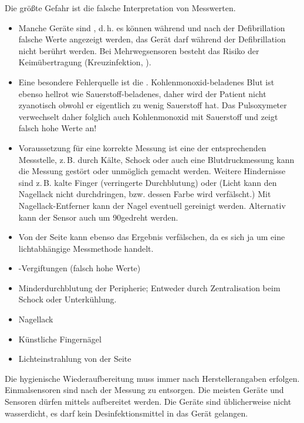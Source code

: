 {%
Die größte Gefahr ist die falsche Interpretation von
Messwerten. 

\begin{itemize}
  \item Manche Geräte sind ,
  d.\,h. es können während und nach der Defibrillation
  falsche Werte angezeigt werden, das Gerät darf während der
  Defibrillation nicht berührt werden. Bei Mehrwegsensoren
  besteht das Risiko der Keimübertragung (Kreuzinfektion,
  ).
  \item Eine besondere Fehlerquelle ist die
  .
  Kohlenmonoxid-beladenes Blut ist ebenso hellrot wie
  Sauerstoff-beladenes, daher wird der Patient nicht
  zyanotisch obwohl er eigentlich zu wenig Sauerstoff hat.
  Das Pulsoxymeter verwechselt daher folglich auch
  Kohlenmonoxid mit Sauerstoff und zeigt falsch hohe Werte
  an!
  \item Voraussetzung für eine korrekte Messung ist eine
   der entsprechenden
  Messstelle, z.\,B. durch Kälte, Schock oder auch eine
  Blutdruckmessung kann die Messung gestört oder unmöglich
  gemacht werden. Weitere Hindernisse sind z.\,B. kalte
  Finger (verringerte Durchblutung) oder 
  (Licht kann den Nagellack nicht durchdringen, bzw. dessen
  Farbe wird verfälscht.) Mit Nagellack-Entferner kann der
  Nagel eventuell gereinigt werden. Alternativ kann der
  Sensor auch um 90\Deg gedreht werden.
  \item Von der Seite  kann ebenso
  das Ergebnis verfälschen, da es sich ja um eine lichtabhängige
  Messmethode handelt.
\end{itemize}

}{
\begin{itemize}
  \item {}-Vergiftungen (falsch hohe Werte)
  \item Minderdurchblutung der Peripherie; Entweder durch
  Zentralisation beim Schock oder Unterkühlung.
  \item Nagellack
  \item Künstliche Fingernägel
  \item Lichteinstrahlung von der Seite
\end{itemize}
}{}{}{}



{%
Die hygienische Wiederaufbereitung muss immer nach
Herstellerangaben erfolgen.
Einmalsensoren sind nach der Messung zu entsorgen.
Die meisten Geräte und Sensoren dürfen mittels
aufbereitet werden. Die Geräte sind üblicherweise nicht
wasserdicht, es darf kein Desinfektionsmittel in das Gerät
gelangen.
}{}{}{}{}








